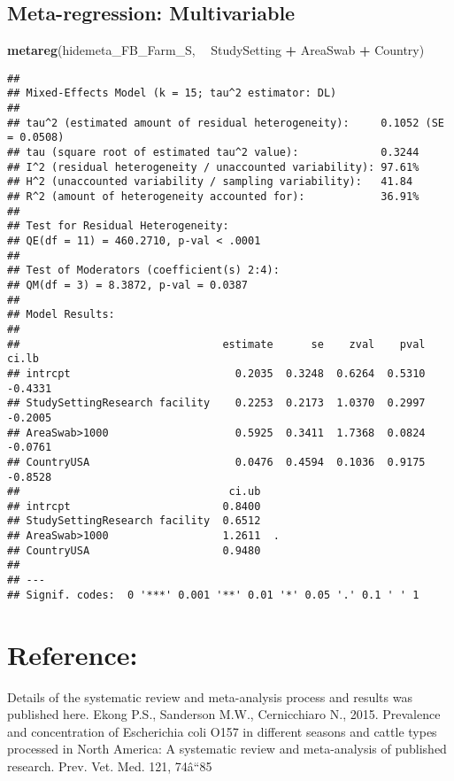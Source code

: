 \documentclass[]{article}
\newenvironment{Shaded}{\begin{snugshade}}{\end{snugshade}}
\newcommand{\KeywordTok}[1]{\textcolor[rgb]{0.13,0.29,0.53}{\textbf{#1}}}
\newcommand{\StringTok}[1]{\textcolor[rgb]{0.31,0.60,0.02}{#1}}
\newcommand{\OperatorTok}[1]{\textcolor[rgb]{0.81,0.36,0.00}{\textbf{#1}}}
\newcommand{\NormalTok}[1]{#1}
\begin{document}
\subsection{Meta-regression:
Multivariable}\label{meta-regression-multivariable}

\begin{Shaded}
\begin{Highlighting}[]
\KeywordTok{metareg}\NormalTok{(hidemeta_FB_Farm_S, }\OperatorTok{~}\StringTok{ }\NormalTok{StudySetting }\OperatorTok{+}\StringTok{ }\NormalTok{AreaSwab }\OperatorTok{+}\StringTok{ }\NormalTok{Country)}
\end{Highlighting}
\end{Shaded}

\begin{verbatim}
## 
## Mixed-Effects Model (k = 15; tau^2 estimator: DL)
## 
## tau^2 (estimated amount of residual heterogeneity):     0.1052 (SE = 0.0508)
## tau (square root of estimated tau^2 value):             0.3244
## I^2 (residual heterogeneity / unaccounted variability): 97.61%
## H^2 (unaccounted variability / sampling variability):   41.84
## R^2 (amount of heterogeneity accounted for):            36.91%
## 
## Test for Residual Heterogeneity: 
## QE(df = 11) = 460.2710, p-val < .0001
## 
## Test of Moderators (coefficient(s) 2:4): 
## QM(df = 3) = 8.3872, p-val = 0.0387
## 
## Model Results:
## 
##                                estimate      se    zval    pval    ci.lb
## intrcpt                          0.2035  0.3248  0.6264  0.5310  -0.4331
## StudySettingResearch facility    0.2253  0.2173  1.0370  0.2997  -0.2005
## AreaSwab>1000                    0.5925  0.3411  1.7368  0.0824  -0.0761
## CountryUSA                       0.0476  0.4594  0.1036  0.9175  -0.8528
##                                 ci.ub   
## intrcpt                        0.8400   
## StudySettingResearch facility  0.6512   
## AreaSwab>1000                  1.2611  .
## CountryUSA                     0.9480   
## 
## ---
## Signif. codes:  0 '***' 0.001 '**' 0.01 '*' 0.05 '.' 0.1 ' ' 1
\end{verbatim}

\section{Reference:}\label{reference}

Details of the systematic review and meta-analysis process and results
was published here. Ekong P.S., Sanderson M.W., Cernicchiaro N., 2015.
Prevalence and concentration of Escherichia coli O157 in different
seasons and cattle types processed in North America: A systematic review
and meta-analysis of published research. Prev. Vet. Med. 121, 74â``85
\end{document}
